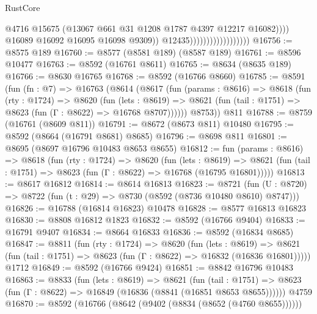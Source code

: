 \begin{lexlean}{RustCore}
\begin{coremodule}
                                                  @4716
                                                  @15675
                                                  (@13067
                                                    @661
                                                    @31
                                                    @1208
                                                    @1787
                                                    @4397
                                                    @12217
                                                    @16082))))
                                            @16089
                                            @16092
                                            @16095
                                            @16098
                                            @9309))
                                        @12435))))))))))))))))))
@16756 := @8575 @189
@16760 := @8577 (@8581 @189) (@8587 @189)
@16761 := @8596 @10477
@16763 := @8592 (@16761 @8611)
@16765 := @8634 (@8635 @189)
@16766 := @8630 @16765
@16768 := @8592 (@16766 @8660)
@16785 := @8591
    (fun (fn : @7) =>
    @16763
      (@8614
        (@8617
          (fun (params : @8616) =>
          @8618
            (fun (rty : @1724) =>
            @8620
              (fun (lets : @8619) =>
              @8621 (fun (tail : @1751) => @8623 (fun (Γ : @8622) => @16768 @8707))))))
        @8753))
    @811
@16788 := @8759 (@16761 (@8609 @811))
@16791 := @8672 (@8673 @811) @10480
@16795 := @8592 (@8664 (@16791 @8681) @8685)
@16796 := @8698 @811
@16801 := @8695 (@8697 @16796 @10483 @8653 @8655)
@16812 := fun (params : @8616) =>
  @8618
    (fun (rty : @1724) =>
    @8620
      (fun (lets : @8619) =>
      @8621 (fun (tail : @1751) => @8623 (fun (Γ : @8622) => @16768 (@16795 @16801)))))
@16813 := @8617 @16812
@16814 := @8614 @16813
@16823 := @8721
    (fun (U : @8720) => @8722 (fun (t : @29) => @8730 (@8592 (@8736 @10480 @8610) @8747)))
@16826 := @16788 (@16814 @16823) @10478
@16828 := @8577 @16813 @16823
@16830 := @8808 @16812 @1823
@16832 := @8592 (@16766 @9404)
@16833 := @16791 @9407
@16834 := @8664 @16833
@16836 := @8592 (@16834 @8685)
@16847 := @8811
    (fun (rty : @1724) =>
    @8620
      (fun (lets : @8619) =>
      @8621 (fun (tail : @1751) => @8623 (fun (Γ : @8622) => @16832 (@16836 @16801)))))
    @1712
@16849 := @8592 (@16766 @9424)
@16851 := @8842 @16796 @10483
@16863 := @8833
    (fun (lets : @8619) =>
    @8621
      (fun (tail : @1751) =>
      @8623 (fun (Γ : @8622) => @16849 (@16836 (@8841 (@16851 @8653 @8655))))))
    @4759
@16870 := @8592 (@16766 (@8642 (@9402 (@8834 (@8652 (@4760 @8655))))))

\end{coremodule}
\end{lexlean}
